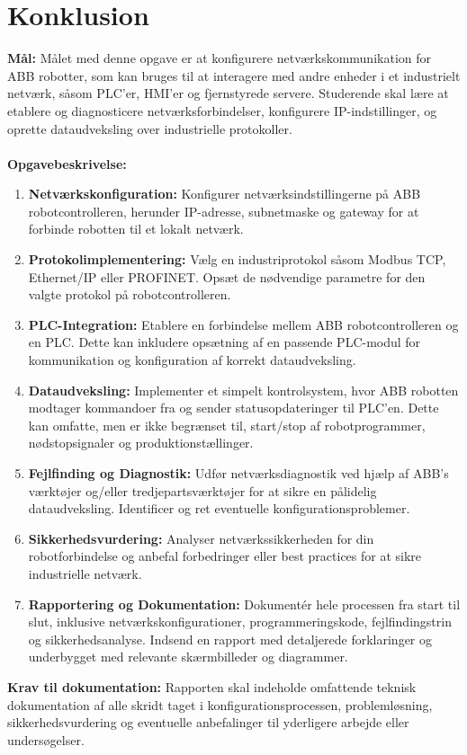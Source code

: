 \section{Konklusion}
\label{sec:konklusion}
\textbf{Mål:} Målet med denne opgave er at konfigurere netværkskommunikation for ABB robotter, som kan bruges til at interagere med andre enheder i et industrielt netværk, såsom PLC'er, HMI'er og fjernstyrede servere. Studerende skal lære at etablere og diagnosticere netværksforbindelser, konfigurere IP-indstillinger, og oprette dataudveksling over industrielle protokoller.
\\\\
\noindent\textbf{Opgavebeskrivelse:}
\begin{enumerate}
	\item \textbf{Netværkskonfiguration:} Konfigurer netværksindstillingerne på ABB robotcontrolleren, herunder IP-adresse, subnetmaske og gateway for at forbinde robotten til et lokalt netværk.
	\item \textbf{Protokolimplementering:} Vælg en industriprotokol såsom Modbus TCP, Ethernet/IP eller PROFINET. Opsæt de nødvendige parametre for den valgte protokol på robotcontrolleren.
	\item \textbf{PLC-Integration:} Etablere en forbindelse mellem ABB robotcontrolleren og en PLC. Dette kan inkludere opsætning af en passende PLC-modul for kommunikation og konfiguration af korrekt dataudveksling.
	\item \textbf{Dataudveksling:} Implementer et simpelt kontrolsystem, hvor ABB robotten modtager kommandoer fra og sender statusopdateringer til PLC'en. Dette kan omfatte, men er ikke begrænset til, start/stop af robotprogrammer, nødstopsignaler og produktionstællinger.
	\item \textbf{Fejlfinding og Diagnostik:} Udfør netværksdiagnostik ved hjælp af ABB's værktøjer og/eller tredjepartsværktøjer for at sikre en pålidelig dataudveksling. Identificer og ret eventuelle konfigurationsproblemer.
	\item \textbf{Sikkerhedsvurdering:} Analyser netværkssikkerheden for din robotforbindelse og anbefal forbedringer eller best practices for at sikre industrielle netværk.
	\item \textbf{Rapportering og Dokumentation:} Dokumentér hele processen fra start til slut, inklusive netværkskonfigurationer, programmeringskode, fejlfindingstrin og sikkerhedsanalyse. Indsend en rapport med detaljerede forklaringer og underbygget med relevante skærmbilleder og diagrammer.
\end{enumerate}
\textbf{Krav til dokumentation:} Rapporten skal indeholde omfattende teknisk dokumentation af alle skridt taget i konfigurationsprocessen, problemløsning, sikkerhedsvurdering og eventuelle anbefalinger til yderligere arbejde eller undersøgelser.

